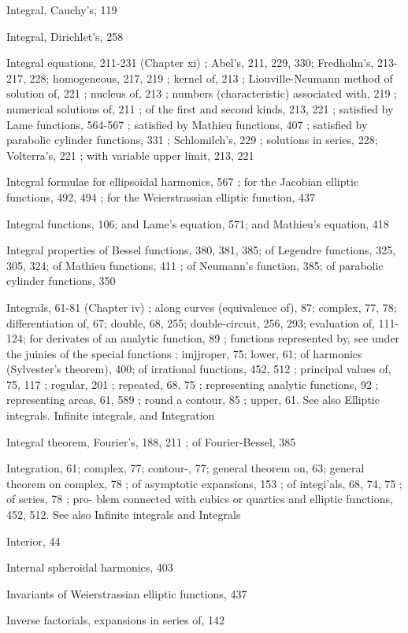 Integral, Cauchy's, 119

Integral, Dirichlet's, 258

Integral equations, 211-231 (Chapter xi) ; Abel's, 211, 229, 330; Fredholm's, 213-217, 228;
homogeneous, 217, 219 ; kernel of, 213 ; Liouville-Neumann method of solution of, 221 ;
nucleus of, 213 ; numbers (characteristic) associated with, 219 ; numerical solutions of, 211 ;
of the first and second kinds, 213, 221 ; satisfied by Lame functions, 564-567 ; satisfied by
Mathieu functions, 407 ; satisfied by parabolic cylinder functions, 331 ; Schlomilch's, 229 ;
solutions in series, 228; Volterra's, 221 ; with variable upper limit, 213, 221

Integral formulae for ellipsoidal harmonics, 567 ; for the Jacobian elliptic functions, 492, 494 ;
for the Weierstrassian elliptic function, 437

Integral functions, 106; and Lame's equation, 571; and Mathieu's equation, 418

Integral properties of Bessel functions, 380, 381, 385; of Legendre functions, 325, 305, 324; of
Mathieu functions, 411 ; of Neumann's function, 385; of parabolic cylinder functions, 350

Integrals, 61-81 (Chapter iv) ; along curves (equivalence of), 87; complex, 77, 78; differentiation
of, 67; double, 68, 255; double-circuit, 256, 293; evaluation of, 111-124; for derivates of an
analytic function, 89 ; functions represented by, see under the juinies of the special functions ;
imjjroper, 75; lower, 61; of harmonics (Sylvester's theorem), 400; of irrational functions,
452, 512 ; principal values of, 75, 117 ; regular, 201 ; repeated,
68, 75 ; representing analytic functions, 92 ; representing areas, 61, 589 ; round a contour,
85 ; upper, 61. See also Elliptic integrals. Infinite integrals, and Integration

Integral theorem, Fourier's, 188, 211 ; of Fourier-Bessel, 385

Integration, 61; complex, 77; contour-, 77; general theorem on, 63; general theorem on
complex, 78 ; of asymptotic expansions, 153 ; of integi'als, 68, 74, 75 ; of series, 78 ; pro-
blem connected with cubics or quartics and elliptic functions, 452, 512. See also Infinite
integrals and Integrals

Interior, 44

Internal spheroidal harmonics, 403

Invariants of Weierstrassian elliptic functions, 437

Inverse factorials, expansions in series of, 142

